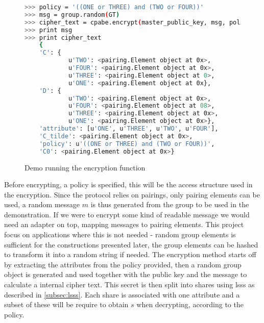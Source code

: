 \begin{figure}[H]
\begin{lstlisting}[language=bash, frame=single, breaklines=true ]
>>> policy = '((ONE or THREE) and (TWO or FOUR))'
>>> msg = group.random(GT)
>>> cipher_text = cpabe.encrypt(master_public_key, msg, policy)
>>> print msg
>>> print cipher_text
    {
    'C': {
            u'TWO': <pairing.Element object at 0x>, 
            u'FOUR': <pairing.Element object at 0x>, 
            u'THREE': <pairing.Element object at 0>, 
            u'ONE': <pairing.Element object at 0x}, 
    'D': {
            u'TWO': <pairing.Element object at 0x>, 
            u'FOUR': <pairing.Element object at 08>, 
            u'THREE': <pairing.Element object at 0x>, 
            u'ONE': <pairing.Element object at 0x>}, 
    'attribute': [u'ONE', u'THREE', u'TWO', u'FOUR'], 
    'C_tilde': <pairing.Element object at 0x>, 
    'policy': u'((ONE or THREE) and (TWO or FOUR))', 
    'C0': <pairing.Element object at 0x>}
\end{lstlisting}  
\caption{Demo running the encryption function}
\label{fig:encfunc} 
\end{figure}


Before encrypting, a policy is specified, this will be the access structure used in the encryption. Since the protocol relies on pairings, only pairing elements can be used, a random message $m$ is thus generated from the group to be used in the demonstration. If we were to encrypt some kind of readable message we would need an adapter on top, mapping messages to pairing elements. This project focus on applications where this is not needed - random group elements is sufficient for the constructions presented later, the group elements can be hashed to transform it into a random string if needed. The encryption method starts off by extracting the attributes from the policy provided, then a random group object is generated and used together with the public key and the message to calculate a internal cipher text. This secret is then split into shares using \gls{lsss} as described in \ref{subsec:lsss}. Each share is associated with one attribute and a subset of these will be require to obtain $s$ when decrypting, according to the policy.
 

